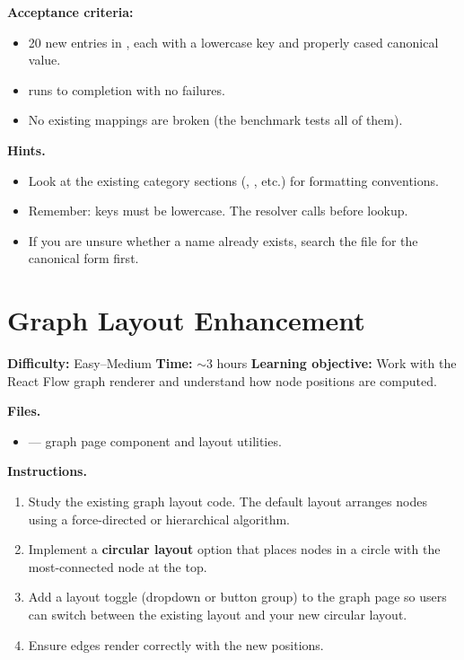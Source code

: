 \begin{tryit}
\textbf{Acceptance criteria:}
\begin{itemize}
    \item 20 new entries in , each with a lowercase
          key and properly cased canonical value.
    \item {} runs to
          completion with no failures.
    \item No existing mappings are broken (the benchmark tests all of
          them).
\end{itemize}
\end{tryit}

\medskip\noindent\textbf{Hints.}

\begin{itemize}
    \item Look at the existing category sections (,
          , etc.) for formatting conventions.
    \item Remember: keys must be lowercase.  The resolver calls
           before lookup.
    \item If you are unsure whether a name already exists, search the file
          for the canonical form first.
\end{itemize}


\section{Graph Layout Enhancement}
\label{sec:ex-graph-layout}

\noindent\textbf{Difficulty:} Easy--Medium \quad
\textbf{Time:} $\sim$3 hours \quad
\textbf{Learning objective:} Work with the React Flow graph renderer and
understand how node positions are computed.

\medskip\noindent\textbf{Files.}

\begin{itemize}
    \item {} --- graph page component and layout
          utilities.
\end{itemize}

\medskip\noindent\textbf{Instructions.}

\begin{enumerate}
    \item Study the existing graph layout code.  The default layout
          arranges nodes using a force-directed or hierarchical algorithm.
    \item Implement a \textbf{circular layout} option that places nodes in
          a circle with the most-connected node at the top.
    \item Add a layout toggle (dropdown or button group) to the graph page
          so users can switch between the existing layout and your new
          circular layout.
    \item Ensure edges render correctly with the new positions.
\end{enumerate}

